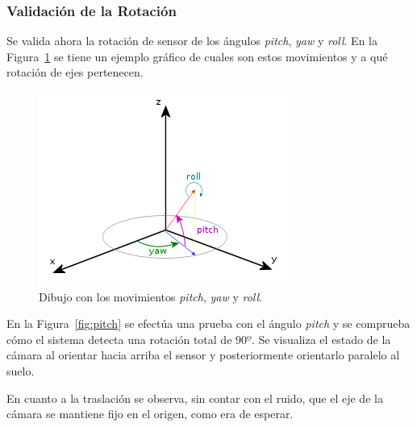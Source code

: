 \subsubsection{Validación de la Rotación}

Se valida ahora la rotación de sensor de los ángulos \textit{pitch}, \textit{yaw} y \textit{roll}. En la Figura~\ref{fig:p-y-r} se tiene un ejemplo gráfico de cuales son estos movimientos y a qué rotación de ejes pertenecen.

\begin{figure}[th]
\centering
\includegraphics[scale=0.9]{Figures/pitch_yaw_roll.png}
\decoRule
\caption[Explicación gráfica del movimiento \textit{pitch}, \textit{yaw} y \textit{roll}]{Dibujo con los movimientos \textit{pitch}, \textit{yaw} y \textit{roll}.}
\label{fig:p-y-r}
\end{figure}

En la Figura~\ref{fig:pitch} se efectúa una prueba con el ángulo \textit{pitch} y se comprueba cómo el sistema detecta una rotación total de $90º$. Se visualiza el estado de la cámara al orientar hacia arriba el sensor y posteriormente orientarlo paralelo al suelo. 

En cuanto a la traslación se observa, sin contar con el ruido, que el eje de la cámara se mantiene fijo en el origen, como era de esperar.

